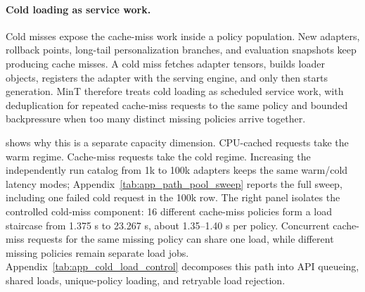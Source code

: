 \documentclass{llmxive}
\begin{document}
\paragraph{Cold loading as service work.}
Cold misses expose the cache-miss work inside a policy population. New adapters, rollback points, long-tail personalization branches, and evaluation snapshots keep producing cache misses. A cold miss fetches adapter tensors, builds loader objects, registers the adapter with the serving engine, and only then starts generation. MinT therefore treats cold loading as scheduled service work, with deduplication for repeated cache-miss requests to the same policy and bounded backpressure when too many distinct missing policies arrive together.

 shows why this is a separate capacity dimension. CPU-cached requests take the warm regime. Cache-miss requests take the cold regime. Increasing the independently run catalog from 1k to 100k adapters keeps the same warm/cold latency modes; Appendix~\cref{tab:app_path_pool_sweep} reports the full sweep, including one failed cold request in the 100k row. The right panel isolates the controlled cold-miss component: 16 different cache-miss policies form a load staircase from 1.375 s to 23.267 s, about 1.35--1.40 s per policy. Concurrent cache-miss requests for the same missing policy can share one load, while different missing policies remain separate load jobs. Appendix~\cref{tab:app_cold_load_control} decomposes this path into API queueing, shared loads, unique-policy loading, and retryable load rejection.
\end{document}
